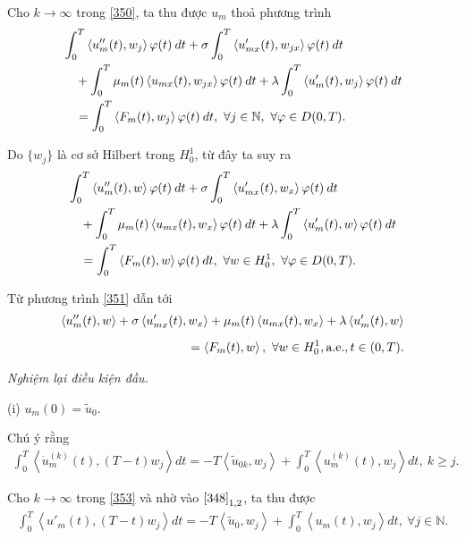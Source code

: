 \documentclass[12pt,a4paper]{article}
\def\N{\mathbb{N}}
\theoremstyle{definition}
\theoremstyle{definition}
\begin{document}
Cho $k \to \infty$ trong \eqref{350}, ta thu được $u_m$ thoả phương trình
\begin{align*}
    &\int_0^T \left<u''_m(t), w_j\right> \varphi(t)\:dt
    + \sigma \int_0^T \left<u'_{mx}(t), w_{jx}\right> \varphi(t)\:dt \notag \\
    &\quad + \int_0^T \mu_m(t) \left<u_{mx}(t), w_{jx}\right>\varphi(t)\:dt
    + \lambda \int_0^T \left<u'_m(t), w_j\right> \varphi(t)\:dt \\
    &\quad = \int_0^T \left< F_m(t), w_j \right> \varphi(t)\:dt, \ \forall j \in \N,\ \forall \varphi \in D(0,T).
\end{align*}

Do $\{w_j\}$ là cơ sở Hilbert trong $H^1_0$, từ đây ta suy ra
\begin{align} \label{351}
    &\int_0^T \left<u''_m(t), w\right> \varphi(t)\:dt
    + \sigma \int_0^T \left<u'_{mx}(t), w_{x}\right> \varphi(t)\:dt \\
    &\quad + \int_0^T \mu_m(t) \left<u_{mx}(t), w_{x}\right>\varphi(t)\:dt
    + \lambda \int_0^T \left<u'_m(t), w\right> \varphi(t)\:dt \notag \\
    &\quad = \int_0^T \left< F_m(t), w \right> \varphi(t)\:dt, \ \forall w \in H^1_0,\ \forall \varphi \in D(0,T). \notag
\end{align}

Từ phương trình \eqref{351} dẫn tới
\begin{align} \label{352}
    \left<u''_m(t), w\right> + \sigma \left<u'_{mx}(t), w_x\right> + \mu_m(t)\left<u_{mx}(t), w_x\right> + \lambda \left<u'_m(t), w\right> \\[5pt]
    = \left<F_m(t), w\right>,\ \forall w \in H^1_0, \text{a.e.}, t \in (0,T). \notag
\end{align}

\textit{Nghiệm lại điều kiện đầu.}

\medskip

(i) $u_m(0) = \tilde{u}_0$.

Chú ý rằng
\begin{align} \label{353}
    \int_0^T \left<\dot{u}_m^{(k)}(t), (T-t)w_j\right> dt = -T \left<\tilde{u}_{0k}, w_j\right> + \int_0^T \left<u_m^{(k)}(t), w_j\right> dt,\ k \ge j.
\end{align}

Cho $k \to \infty$ trong \eqref{353} và nhờ vào $\eqref{348}_{1,2}$, ta thu được
\begin{align} \label{354}
    \int_0^T \left<u'_m(t), (T-t)w_j\right> dt = -T \left<\tilde{u}_{0}, w_j\right> + \int_0^T \left<u_m(t), w_j\right> dt,\ \forall j \in \N.
\end{align}
\end{document}
